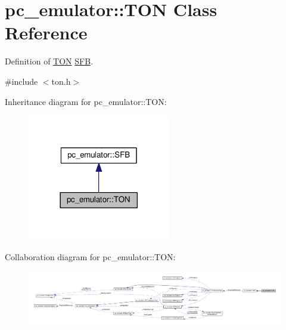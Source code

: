 \hypertarget{classpc__emulator_1_1TON}{}\section{pc\+\_\+emulator\+:\+:T\+ON Class Reference}
\label{classpc__emulator_1_1TON}


Definition of \hyperlink{classpc__emulator_1_1TON}{T\+ON} \hyperlink{classpc__emulator_1_1SFB}{S\+FB}.  




{\ttfamily \#include $<$ton.\+h$>$}



Inheritance diagram for pc\+\_\+emulator\+:\+:T\+ON\+:
\nopagebreak
\begin{figure}[H]
\begin{center}
\leavevmode
\includegraphics[width=177pt]{classpc__emulator_1_1TON__inherit__graph}
\end{center}
\end{figure}


Collaboration diagram for pc\+\_\+emulator\+:\+:T\+ON\+:
\nopagebreak
\begin{figure}[H]
\begin{center}
\leavevmode
\includegraphics[width=350pt]{classpc__emulator_1_1TON__coll__graph}
\end{center}
\end{figure}
